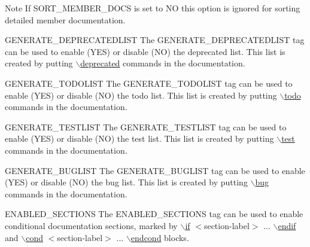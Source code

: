 \begin{DoxyDescription}
\begin{DoxyNote}{Note}
If {\ttfamily SORT\_\-MEMBER\_\-DOCS} is set to {\ttfamily NO} this option is ignored for sorting detailed member documentation.
\end{DoxyNote}
\label{config_cfg_generate_deprecatedlist}
\hypertarget{config_cfg_generate_deprecatedlist}{}
 
\item[{\ttfamily GENERATE\_\-DEPRECATEDLIST} ] The GENERATE\_\-DEPRECATEDLIST tag can be used to enable (YES) or disable (NO) the deprecated list. This list is created by putting \hyperlink{commands_cmddeprecated}{$\backslash$deprecated} commands in the documentation.

\label{config_cfg_generate_todolist}
\hypertarget{config_cfg_generate_todolist}{}
 
\item[{\ttfamily GENERATE\_\-TODOLIST} ] The GENERATE\_\-TODOLIST tag can be used to enable (YES) or disable (NO) the todo list. This list is created by putting \hyperlink{commands_cmdtodo}{$\backslash$todo} commands in the documentation.

\label{config_cfg_generate_testlist}
\hypertarget{config_cfg_generate_testlist}{}
 
\item[{\ttfamily GENERATE\_\-TESTLIST} ] The GENERATE\_\-TESTLIST tag can be used to enable (YES) or disable (NO) the test list. This list is created by putting \hyperlink{commands_cmdtest}{$\backslash$test} commands in the documentation.

\label{config_cfg_generate_buglist}
\hypertarget{config_cfg_generate_buglist}{}
 
\item[{\ttfamily GENERATE\_\-BUGLIST} ] The GENERATE\_\-BUGLIST tag can be used to enable (YES) or disable (NO) the bug list. This list is created by putting \hyperlink{commands_cmdbug}{$\backslash$bug} commands in the documentation.

\label{config_cfg_enabled_sections}
\hypertarget{config_cfg_enabled_sections}{}
 
\item[{\ttfamily ENABLED\_\-SECTIONS} ] The {\ttfamily ENABLED\_\-SECTIONS} tag can be used to enable conditional documentation sections, marked by \hyperlink{commands_cmdif}{$\backslash$if} $<$section-\/label$>$ ... \hyperlink{commands_cmdendif}{$\backslash$endif} and \hyperlink{commands_cmdcond}{$\backslash$cond} $<$section-\/label$>$ ... \hyperlink{commands_cmdendcond}{$\backslash$endcond} blocks.


\end{DoxyDescription}
